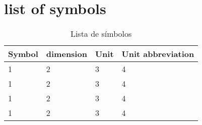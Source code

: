 \section*{list of symbols} \label{section: symbols}

\begin{table}[ht]
\centering
\caption{Lista de símbolos}
\begin{tabular}[t]
{m{}m{}m{}m{}}
\toprule
\textbf{Symbol}&\textbf{dimension}&\textbf{Unit}&\textbf{Unit abbreviation}\\
\midrule
1&2&3&4\\
1&2&3&4\\
1&2&3&4\\
1&2&3&4\\
\bottomrule
\end{tabular}
\end{table}